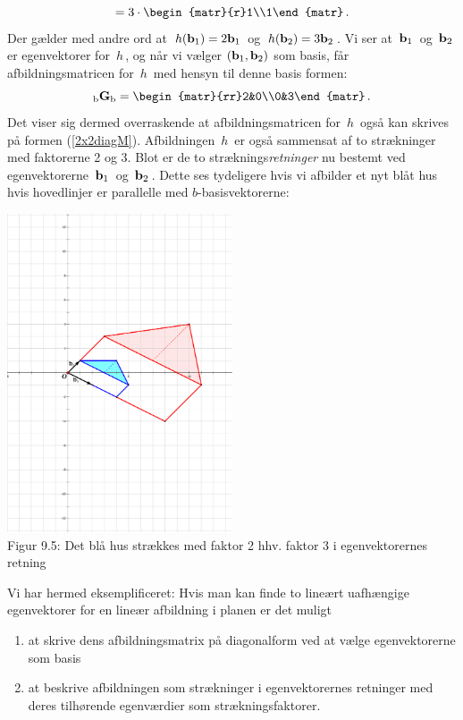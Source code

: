 \begin{example}
\begin{equation*}
=3\cdot\begin{matr}{r}1\\1\end{matr}\,.
\end{equation*}
Der gælder med andre ord
at $\,h(\mathbf{b}_1)=2\mathbf{b}_1\,$ og $\,h(\mathbf{b}_2)=3\mathbf{b}_2\,$. 
Vi ser at $\,\mathbf{b}_1\,$ og $\,\mathbf{b}_2\,$ er egenvektorer for $\,h\,$, og når vi vælger $(\mathbf{b}_1,\mathbf{b}_2)$ som basis, får afbildningsmatricen for $\,h\,$ med hensyn til denne basis formen: 
\begin{equation*}
\matind bGb=\begin{matr}{rr}2&0\\0&3\end{matr}\,.
\end{equation*}
Det viser sig dermed overraskende at afbildningsmatricen for $\,h\,$ også kan skrives på formen (\ref{2x2diagM}). Afbildningen $\,h\,$ er også sammensat af to strækninger med faktorerne 2 og 3. Blot er de to stræknings\textit{retninger} nu bestemt ved egenvektorerne $\,\mathbf{b}_1\,$ og $\,\mathbf{b}_2\,$. Dette ses tydeligere hvis vi afbilder et nyt blåt hus hvis hovedlinjer er parallelle med $b$-basisvektorerne:
\begin{center}
\includegraphics[trim=4.5cm 9.5cm 2cm 9cm,width=0.50\textwidth,clip]{Husdrejet2.pdf} \\
Figur 9.5: Det blå hus strækkes med faktor 2 hhv. faktor 3 i egenvektorernes retning	
\end{center}

Vi har hermed eksemplificeret: Hvis man kan finde to lineært uafhængige egenvektorer for en lineær afbildning i planen er det muligt
\begin{enumerate}
\item
at skrive dens afbildningsmatrix på diagonalform ved at vælge egenvektorerne som basis
\item 
at beskrive afbildningen som strækninger i egenvektorernes retninger med deres tilhørende egenværdier som strækningsfaktorer.
\end{enumerate}
\end{example}

